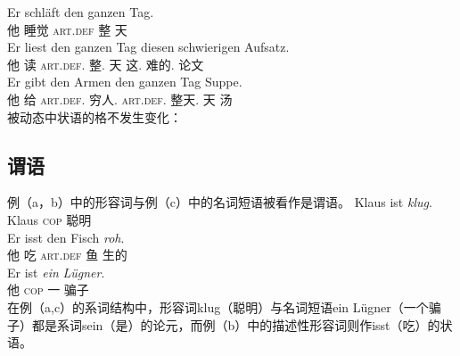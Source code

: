 \eal
\ex 
\gll Er schläft den ganzen Tag.\\
     他 睡觉 \textsc{art}.\textsc{def} 整 天\\
\ex 
\gll Er liest den ganzen Tag diesen schwierigen Aufsatz.\\
	 他 读 \textsc{art}.\textsc{def}.\acc{} 整.\acc{} 天 这.\acc{} 难的.\acc{} 论文\\
\ex 
\gll Er gibt den Armen den ganzen Tag Suppe.\\
	 他 给 \textsc{art}.\textsc{def}.\dat{} 穷人.\dat{} \textsc{art}.\textsc{def}.\acc{} 整天.\acc{} 天 汤\\
\zl
被动态中状语的格不发生变化：
\eal
{}
\zl
{}

\subsection{谓语}
例（a，b）中的形容词与例（c）中的名词短语被看作是谓语。
\eal
\ex 
\gll Klaus ist \emph{klug}.\\
	 Klaus \textsc{cop} 聪明\\
\ex 
\gll Er isst den Fisch \emph{roh}.\\
	 他 吃 \textsc{art}.\textsc{def} 鱼 生的\\
\ex 
\gll Er ist \emph{ein} \emph{Lügner}.\\
     他 \textsc{cop} 一 骗子\\
\zl
在例（a,c）的系词结构中，形容词klug（聪明）与名词短语ein Lügner（一个骗子）都是系词sein（是）的论元，而例（b）中的描述性形容词则作isst（吃）的状语。

